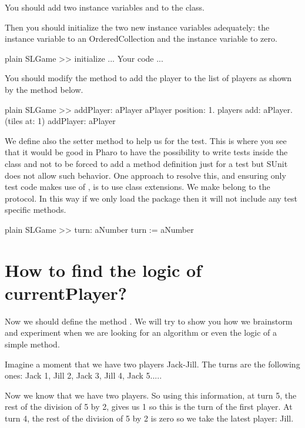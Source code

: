 \documentclass[10pt,twoside,english]{_support/latex/sbabook/sbabook}
\begin{document}
You should add two instance variables  and  to the  class. 

Then you should initialize the two new instance variables adequately: the  instance variable to an OrderedCollection and the  instance variable to zero. 

\begin{displaycode}{plain}
SLGame >> initialize
	... Your code ...
\end{displaycode}

You should modify the method  to add the player to the list of players as shown by the method below.

\begin{displaycode}{plain}
SLGame >> addPlayer: aPlayer
	aPlayer position: 1.
	players add: aPlayer. 
	(tiles at: 1) addPlayer: aPlayer
\end{displaycode}

We define also the setter method  to help us for the test. This is where you see that 
it would be good in Pharo to have the possibility to write tests inside the class and not to be forced to add a method definition just for a test but SUnit does not allow such behavior.
One approach to resolve this, and ensuring only test code makes use of , is to use class extensions. We make  belong to the  protocol. 
In this way if we only load the  package then it will not include any test specific methods.

\begin{displaycode}{plain}
SLGame >> turn: aNumber
	turn := aNumber
\end{displaycode}
\section{How to find the logic of currentPlayer?}
Now we should define the method . We will try to show you how we brainstorm and experiment when we are looking for an algorithm or even the logic of a simple method. 

Imagine a moment that we have two players Jack-Jill. The turns are the following ones: Jack 1, Jill 2, Jack 3, Jill 4, Jack 5.....

Now we know that we have two players. So using this information, 
at turn 5, the rest of the division of 5 by 2, gives us 1 so this is the turn of the first player. At turn 4, the rest of the division of 5 by 2 is zero so we take the latest player: Jill. 
\end{document}
